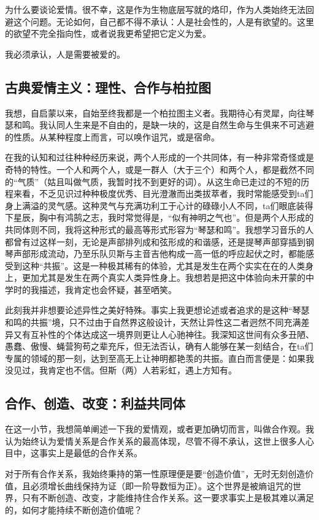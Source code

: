 \documentclass[11pt,twoside,fontset=none,scheme=plain]{ctexart}
\begin{document}
为什么要谈论爱情。很不幸，这是作为生物底层写就的烙印，作为人类始终无法回避这个问题。无论如何，自己都不得不承认：人是社会性的，人是有欲望的。这里的欲望不完全指向性，或者说我更希望把它定义为爱。

我必须承认，人是需要被爱的。

\subsection{古典爱情主义：理性、合作与柏拉图}

我想，自启蒙以来，自始至终我都是一个柏拉图主义者。我期待心有灵犀，向往琴瑟和鸣。我认同人生来是不自由的，是缺一块的，这是自然生命与生俱来不可逃避的性质。从某种程度上而言，可以唤作诅咒，或是宿命。

在我的认知和过往种种经历来说，两个人形成的一个共同体，有一种非常奇怪或是奇特的特性。一个人和两个人，或是一群人（大于三个）和两个人，都是截然不同的“气质”（姑且叫做气质，我暂时找不到更好的词）。从这生命已走过的不短的历程来看，不乏见识过种种极度优秀、目光澄澈而出类拔萃者，我时常能感受到ta们身上满溢的灵气感。这种灵气与充满功利工于心计的碌碌小人不同，ta们眼底装得下星辰，胸中有鸿鹄之志，我时常觉得是，“似有神明之气也”。但是两个人形成的共同体则不同，我将这种形式的最高等形式形容为“琴瑟和鸣”。我想学习音乐的人都曾有过这样一刻，无论是声部排列成和弦形成的和谐感，还是提琴声部穿插到钢琴声部形成流动，乃至乐队贝斯与主音吉他构成一高一低的呼应起伏之时，都能感受到这种“共振”。这是一种极其稀有的体验，尤其是发生在两个实实在在的人类身上，更加尤其是发生在两个真实人类异性身上。我想若是把这中体验向未开蒙的中学时的我描述，我肯定也会怀疑，甚至哂笑。

此刻我并非想要论述异性之美好特殊。事实上我更想论述或者追求的是这种“琴瑟和鸣的共振”境，只不过由于自然界这般设计，天然让异性这二者迥然不同充满差异又有互补性的个体达成这一境界则更让人心驰神往。我深知这世间有众多丑陋、愚蠢、傲慢、蝇营狗苟之辈充斥，但无法否认，确有人能够在某一刻结合，在ta们专属的领域的那一刻，达到至高无上让神明都艳羡的共振。直白而言便是：如果我没见过，我肯定也不信。但斯（两）人若彩虹，遇上方知有。

\subsection{合作、创造、改变：利益共同体}

在这一小节，我想简单阐述一下我的爱情观，或者更加确切而言，叫做合作观。我认为始终认为爱情关系是合作关系的最高体现，尽管不得不承认，这世上很多人心目中，这事实上是最低的合作关系。

对于所有合作关系，我始终秉持的第一性原理便是要“创造价值”，无时无刻创造价值，且必须增长曲线保持为证（即一阶导数恒为正）。这个世界是被熵诅咒的世界，只有不断创造、改变，才能维持住合作关系。这一要求事实上是极其难以满足的，如何才能持续不断创造价值呢？
\end{document}

